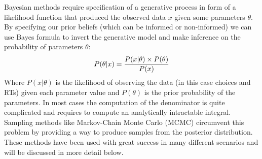 \documentclass[letterpaper,10pt,english]{sphinxmanual}
\begin{document}
Bayesian methods require specification of a generative process in form
of a likelihood function that produced the observed data $x$
given some parameters $\theta$. By specifying our prior beliefs
(which can be informed or non-informed) we can use Bayes formula to
invert the generative model and make inference on the probability of
parameters $\theta$:
\label{methods:bayes}\begin{gather}
\begin{split}P(\theta|x) = \frac{P(x|\theta) \times P(\theta)}{P(x)}\end{split}\notag
\end{gather}
Where $P(x|\theta)$ is the likelihood of observing the data (in
this case choices and RTs) given each parameter value and
$P(\theta)$ is the prior probability of the parameters. In most
cases the computation of the denominator is quite complicated and
requires to compute an analytically intractable integral. Sampling
methods like Markov-Chain Monte Carlo (MCMC) \citep{GamermanLopes06}
circumvent this problem by providing a way to produce samples from the
posterior distribution. These methods have been used with great
success in many different scenarios \citep{GelmanCarlinSternEtAl03}
and will be discussed in more detail below.
\end{document}
